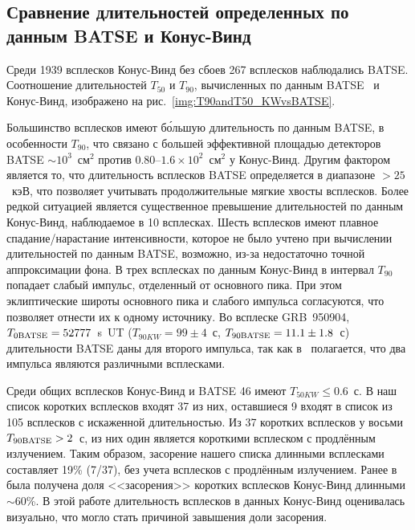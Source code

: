 \begin{landscape}

\end{landscape}

\subsection{Сравнение длительностей определенных по данным BATSE и Конус-Винд}
Среди 1939 всплесков Конус-Винд без сбоев 267 всплесков наблюдались BATSE. 
Соотношение длительностей $T_{50}$ и $T_{90}$, вычисленных по данным BATSE~\citep{Paciesas_1999} 
и Конус-Винд, изображено на рис.~\ref{img:T90andT50_KWvsBATSE}.

Большинство всплесков имеют б\'{о}льшую длительность по данным BATSE, 
в особенности $T_{90}$, что связано с большей  эффективной площадью детекторов 
BATSE $\sim 10^3$~см$^2$ против 0.80--$1.6\times 10^2$~см$^2$ у Конус-Винд. 
Другим фактором является то, что длительность всплесков BATSE определяется в 
диапазоне $>25$~кэВ, что позволяет учитывать продолжительные мягкие хвосты всплесков. 
Более редкой ситуацией является существенное превышение длительностей по данным Конус-Винд, 
наблюдаемое в 10 всплесках. Шесть всплесков имеют плавное спадание/нарастание интенсивности, 
которое не было учтено при вычислении  длительностей по данным BATSE, возможно, 
из-за недостаточно точной аппроксимации фона. В трех всплесках по данным Конус-Винд 
в интервал $T_{90}$ попадает слабый импульс, отделенный от основного пика. 
При этом эклиптические широты основного пика и слабого импульса согласуются, 
что позволяет отнести их к одному источнику. Во всплеске GRB~950904, 
$T_{0 {\mathrm{BATSE}}} = 52777$~s~UT ($T_{90{KW}} = 99 \pm 4$~с, $T_{90{\mathrm{BATSE}}} = 11.1\pm 1.8$~с) 
длительности BATSE даны для второго импульса, так как в~\citep{Hurley_2005} полагается, 
что два импульса являются различными всплесками.

Среди общих всплесков Конус-Винд и BATSE 46 имеют $T_{50{KW}} \leq 0.6$~с. 
В наш список коротких всплесков входят 37 из них, оставшиеся 9 входят в список из 105 
всплесков с искаженной длительностью. Из 37 коротких всплесков у восьми $T_{90{\mathrm{BATSE}}} > 2$~с, 
из них один является короткими всплеском с продлённым излучением. Таким образом, 
засорение нашего списка длинными всплесками составляет 19\% (7/37), без учета 
всплесков с продлённым излучением. Ранее в~\citep{Ofek_2007ApJ} была получена доля 
<<засорения>> коротких всплесков Конус-Винд длинными $\sim 60$\%. В этой работе 
длительность всплесков в данных Конус-Винд оценивалась визуально, что могло 
стать причиной завышения доли засорения. 

